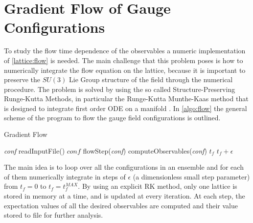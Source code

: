 \section{Gradient Flow of Gauge Configurations}
To study the flow time dependence of the observables a numeric implementation of \cref{lattice:flow} is needed. The main challenge that this problem poses is how to numerically integrate the flow equation on the lattice, because it is important to preserve the $SU(3)$ Lie Group structure of the field through the numerical procedure. The problem is solved by using the so called Structure-Preserving Runge-Kutta Methods, in particular the Runge-Kutta Munthe-Kaas method that is designed to integrate first order ODE on a manifold \cite{munthe-kaas_runge-kutta_1998,munthe-kaas_lie-butcher_1995,celledoni_introduction_2014}. In \cref{algo:flow} the general scheme of the program to flow the gauge field configurations is outlined.
\begin{algorithm}[bht!]
    \caption{Gradient Flow}\label{algo:flow}
    \begin{algorithmic}[1]
        \State \textit{conf} \gets readInputFile()     
            \State $conf$ \gets flowStep(\textit{conf})
            computeObservables(\textit{conf}) 
            \State $t_f$ \gets $t_f + \epsilon$
        \EndFor
    \EndFor
\end{algorithmic}
\end{algorithm}

The main idea is to loop over all the configurations in an ensemble and for each of them numerically integrate in steps of $\epsilon$ (a dimensionless small step parameter) from $t_f=0$ to $t_f = t_f^{MAX}$. By using an explicit RK method, only one lattice is stored in memory at a time, and is updated at every iteration. At each step, the expectation values of all the desired observables are computed and their value stored to file for further analysis.

